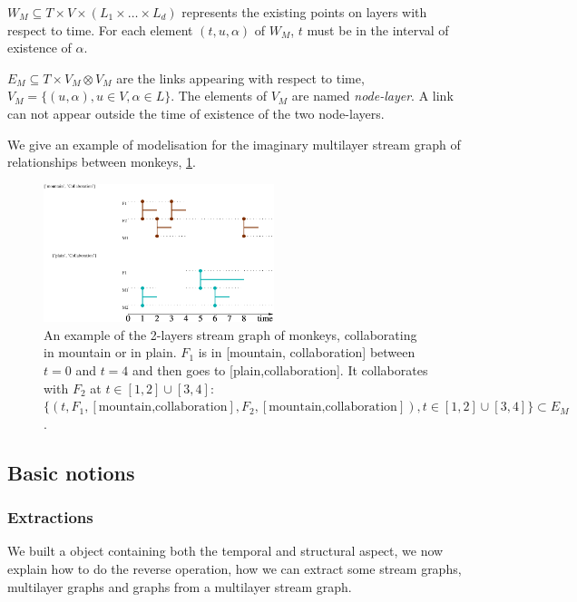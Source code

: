 \documentclass{svproc}
\begin{document}
	$W_M \subseteq T\times V \times (L_1 \times \dots \times L_d)$ represents the existing points on layers with respect to time. For each element $(t,u,\alpha)$ of $W_M$, $t$ must be in the interval of existence of $\alpha$.

   $E_M \subseteq T\times V_M \otimes V_M$ are the links appearing with respect to time,  $V_M = \{ (u,\alpha), u\in V, \alpha \in L\}$. The elements of $V_M$ are named {\em node-layer}. A link can not appear outside the time of existence of the two node-layers.

   We give an example of modelisation for the imaginary multilayer stream graph of relationships between monkeys, \cref{multistreamMonkeys}.
   \begin{figure}[t!]
   	\includegraphics[width=0.6\textwidth]{img/monkeymls.pdf}
   	\caption{An example of the 2-layers stream graph of monkeys, collaborating in mountain or in plain. $F_1$ is in [mountain, collaboration] between $t=0$ and $t=4$ and then goes to [plain,collaboration]. It collaborates with $F_2$ at $t\in [1,2]\cup[3,4]$: $\{(t,F_1,[\text{mountain,collaboration}],F_2,[\text{mountain,collaboration}]),t\in [1,2]\cup[3,4]\} \subset E_M$.}
   	\label{multistreamMonkeys}
   \end{figure}

%
\subsection{Basic notions}
%
\subsubsection{Extractions}

We built a object containing both the temporal and structural aspect, we now explain how to do the reverse operation, how we can extract some stream graphs, multilayer graphs and graphs from a multilayer stream graph.
\end{document}
